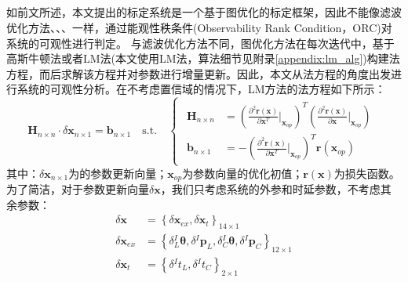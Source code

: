 \subsection{}
如前文所述，本文提出的标定系统是一个基于图优化的标定框架，因此不能像滤波优化方法\cite{huai2022observability}、\cite{mirzaei2008kalman}、\cite{yang2019degenerate}、\cite{lv2022observability}一样，通过能观性秩条件(Observability Rank Condition，ORC)对系统的可观性进行判定。
与滤波优化方法不同，图优化方法在每次迭代中，基于高斯牛顿法或者LM法(本文使用LM法，算法细节见附录\ref{appendix:lm_alg})构建法方程，而后求解该方程并对参数进行增量更新。因此，本文从法方程的角度出发进行系统的可观性分析。在不考虑置信域的情况下，LM方法的法方程如下所示：
\begin{equation}
  \boldsymbol{H}_{n\times n}\cdot\delta\boldsymbol{x}_{n\times 1}=\boldsymbol{b}_{n\times 1}
  \quad
  \mathrm{s.t.}
  \quad
  \begin{cases}
    \begin{aligned}
      \boldsymbol{H}_{n\times n} & =	\left( \frac{\partial^2 \boldsymbol{r}(\boldsymbol{x})}{\partial \boldsymbol{x}^T}\bigg|_{\boldsymbol{x}_{op}}\right)^T
      \left( \frac{\partial^2 \boldsymbol{r}(\boldsymbol{x})}{\partial \boldsymbol{x}}\bigg|_{\boldsymbol{x}_{op}}\right)                                                                       \\
      \boldsymbol{b}_{n\times 1} & =-\left( \frac{\partial^2 \boldsymbol{r}(\boldsymbol{x})}{\partial \boldsymbol{x}^T}\bigg|_{\boldsymbol{x}_{op}}\right)^T\boldsymbol{r}(\boldsymbol{x}_{op})
    \end{aligned}
  \end{cases}
\end{equation}
其中：$\delta\boldsymbol{x}_{n\times1}$为的参数更新向量；$\boldsymbol{x}_{op}$为参数向量的优化初值；$\boldsymbol{r}(\boldsymbol{x})$为损失函数。
为了简洁，对于参数更新向量$\delta\boldsymbol{x}$，我们只考虑系统的外参和时延参数，不考虑其余参数：
\begin{equation}
  \begin{aligned}
    \delta\boldsymbol{x}      & =\left\lbrace
    \delta\boldsymbol{x}_{ex},\delta\boldsymbol{x}_{t}
    \right\rbrace_{14\times 1}                                                                                                                                                                                \\
    \delta\boldsymbol{x}_{ex} & =\left\lbrace \delta{^{I}_{L}\boldsymbol{\theta}},\delta{^{I}}\boldsymbol{p}_{L},\delta{^{I}_{C}\boldsymbol{\theta}},\delta{^{I}}\boldsymbol{p}_{C}\right\rbrace_{12\times 1} \\
    \delta\boldsymbol{x}_{t}  & =\left\lbrace \delta{^{I}t_{L}},\delta{^{I}t_{C}}\right\rbrace_{2\times 1}                                                                                                    \\
  \end{aligned}
\end{equation}
